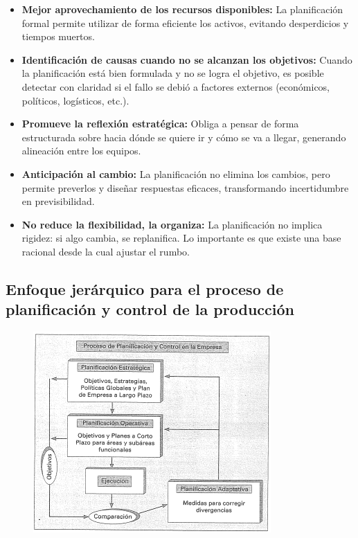 \documentclass[a4paper,oneside,11pt]{article}
\begin{document}
\begin{itemize}
    \item \textbf{Mejor aprovechamiento de los recursos disponibles:} La planificación formal permite utilizar de forma eficiente los activos, evitando desperdicios y tiempos muertos.
    \item \textbf{Identificación de causas cuando no se alcanzan los objetivos:} Cuando la planificación está bien formulada y no se logra el objetivo, es posible detectar con claridad si el fallo se debió a factores externos (económicos, políticos, logísticos, etc.).
    \item \textbf{Promueve la reflexión estratégica:} Obliga a pensar de forma estructurada sobre hacia dónde se quiere ir y cómo se va a llegar, generando alineación entre los equipos.
    \item \textbf{Anticipación al cambio:} La planificación no elimina los cambios, pero permite preverlos y diseñar respuestas eficaces, transformando incertidumbre en previsibilidad.
    \item \textbf{No reduce la flexibilidad, la organiza:} La planificación no implica rigidez: si algo cambia, se replanifica. Lo importante es que existe una base racional desde la cual ajustar el rumbo.
\end{itemize}

\subsection{Enfoque jerárquico para el proceso de planificación y control de la producción}

\begin{figure} [ht!]
    \centering
    \includegraphics[scale=1]{niveles.png}
\end{figure}
\end{document}
